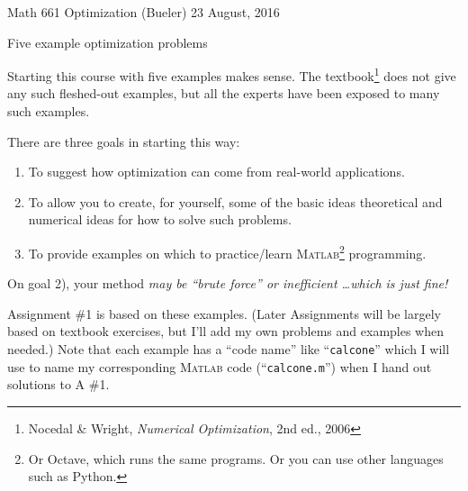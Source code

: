 \documentclass[11pt]{amsart}
\newcommand{\Matlab}{\textsc{Matlab}\xspace}
\begin{document}
\scriptsize \noindent Math 661 Optimization (Bueler) \hfill 23 August, 2016
\normalsize

\medskip\bigskip
\Large
\centerline{Five example optimization problems}

\bigskip\medskip
\normalsize

\thispagestyle{empty}

Starting this course with five examples makes sense.  The textbook\footnote{Nocedal \& Wright, \emph{Numerical Optimization}, 2nd ed., 2006} does not give any such fleshed-out examples, but all the experts have been exposed to many such examples.

There are three goals in starting this way:
\renewcommand{\labelenumi}{\arabic{enumi})}
\begin{enumerate}
\item To suggest how optimization can come from real-world applications.
\item To allow you to create, for yourself, some of the basic ideas theoretical and numerical ideas for how to solve such problems.
\item To provide examples on which to practice/learn \Matlab\footnote{Or Octave, which runs the same programs.  Or you can use other languages such as Python.} programming.
\end{enumerate}
On goal 2), your method \emph{may be ``brute force'' or inefficient \dots which is just fine!}

Assignment \#1 is based on these examples.  (Later Assignments will be largely based on textbook exercises, but I'll add my own problems and examples when needed.)  Note that each example has a ``code name'' like ``\texttt{calcone}'' which I will use to name my corresponding \Matlab code (``\texttt{calcone.m}'') when I hand out solutions to A \#1.
\end{document}
